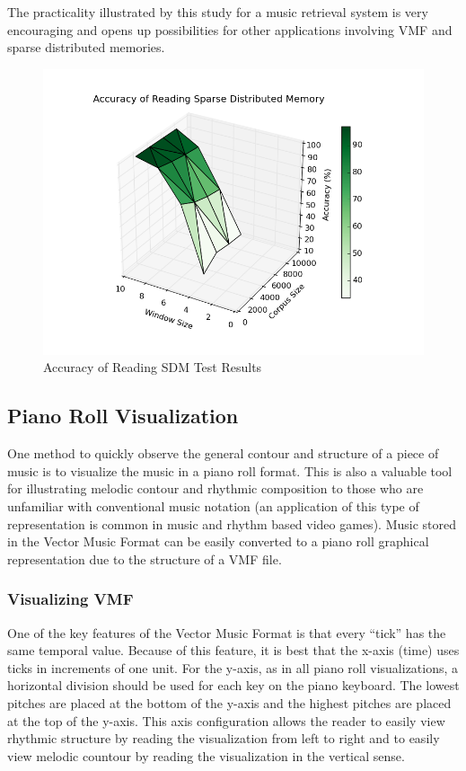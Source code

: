 The practicality illustrated by this study for a music retrieval system is very encouraging and opens up possibilities for other applications involving VMF and sparse distributed memories.

\begin{figure}
  \begin{center}
    \includegraphics[scale=1]{resources/sdm_color.png}
    \caption{Accuracy of Reading SDM Test Results}
    \label{fig:sdmResults}
  \end{center}
\end{figure}

\subsection{Piano Roll Visualization}

One method to quickly observe the general contour and structure of a piece of music is to visualize the music in a piano roll format. This is also a valuable tool for illustrating melodic contour and rhythmic composition to those who are unfamiliar with conventional music notation (an application of this type of representation is common in music and rhythm based video games). Music stored in the Vector Music Format can be easily converted to a piano roll graphical representation due to the structure of a VMF file.

\subsubsection{Visualizing VMF}

One of the key features of the Vector Music Format is that every ``tick'' has the same temporal value. Because of this feature, it is best that the x-axis (time) uses ticks in increments of one unit. For the y-axis, as in all piano roll visualizations, a horizontal division should be used for each key on the piano keyboard. The lowest pitches are placed at the bottom of the y-axis and the highest pitches are placed at the top of the y-axis. This axis configuration allows the reader to easily view rhythmic structure by reading the visualization from left to right and to easily view melodic countour by reading the visualization in the vertical sense.

